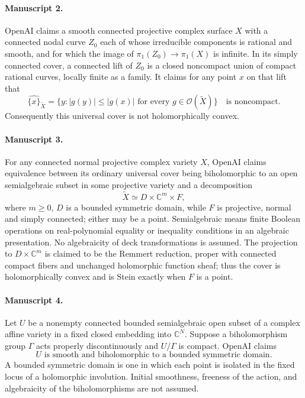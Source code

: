 \documentclass[11pt]{article}
\begin{document}
\paragraph{Manuscript 2.}
OpenAI claims a smooth connected projective complex surface $X$ with a connected nodal curve $Z_0$ each of whose irreducible components is rational and smooth, and for which the image of $\pi_1(Z_0)\to\pi_1(X)$ is infinite. In its simply connected cover, a connected lift of $Z_0$ is a closed noncompact union of compact rational curves, locally finite as a family. It claims for any point $x$ on that lift that
\[
\widehat{\{x\}}_{\widetilde X}=\{y:|g(y)|\le|g(x)|\text{ for every }g\in\mathcal O(\widetilde X)\}
\quad\text{is noncompact}.
\]
Consequently this universal cover is not holomorphically convex.

\paragraph{Manuscript 3.}
For any connected normal projective complex variety $X$, OpenAI claims equivalence between its ordinary universal cover being biholomorphic to an open semialgebraic subset in some projective variety and a decomposition
\[
\widetilde X\simeq D\times\mathbb C^m\times F,
\]
where $m\ge0$, $D$ is a bounded symmetric domain, while $F$ is projective, normal and simply connected; either may be a point. Semialgebraic means finite Boolean operations on real-polynomial equality or inequality conditions in an algebraic presentation. No algebraicity of deck transformations is assumed. The projection to $D\times\mathbb C^m$ is claimed to be the Remmert reduction, proper with connected compact fibers and unchanged holomorphic function sheaf; thus the cover is holomorphically convex and is Stein exactly when $F$ is a point.

\paragraph{Manuscript 4.}
Let $U$ be a nonempty connected bounded semialgebraic open subset of a complex affine variety in a fixed closed embedding into $\mathbb C^N$. Suppose a biholomorphism group $\Gamma$ acts properly discontinuously and $U/\Gamma$ is compact. OpenAI claims
\[
U\text{ is smooth and biholomorphic to a bounded symmetric domain}.
\]
A bounded symmetric domain is one in which each point is isolated in the fixed locus of a holomorphic involution. Initial smoothness, freeness of the action, and algebraicity of the biholomorphisms are not assumed.
\end{document}
